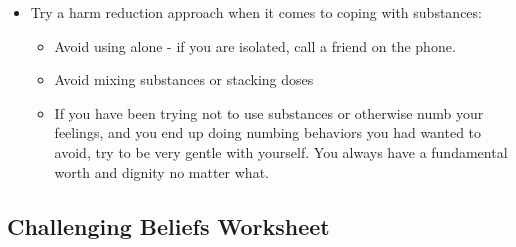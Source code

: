 \documentclass[12pt,letterpaper]{book}
\begin{document}
\begin{itemize}
    \item Try a harm reduction approach when it comes to coping with substances:
    \begin{itemize}
        \item Avoid using alone - if you are isolated, call a friend on the phone.
        \item Avoid mixing substances or stacking doses
        \item If you have been trying not to use substances or otherwise numb your feelings, and you end up doing numbing behaviors you had wanted to avoid, try to be very gentle with yourself.  You always have a fundamental worth and dignity no matter what.
    \end{itemize}
\end{itemize}
\subsection{Challenging Beliefs Worksheet}
\label{challenge}

\end{document}
